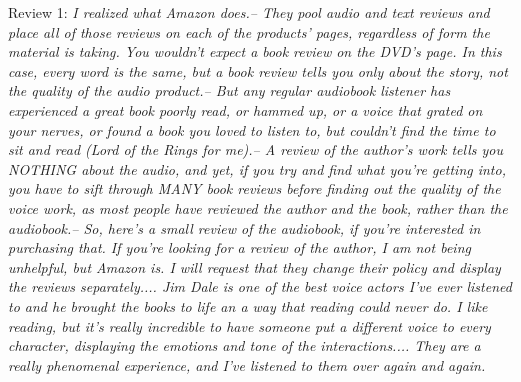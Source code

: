 \documentclass[12pt, a4paper]{article}
\begin{document}
\dotfill
\begin{itemize}
    {\fontsize{9pt}{11pt}\selectfont
    \item Review 1: \textit{I realized what Amazon does.-- They pool audio and text reviews and place all of those reviews on each of the products' pages, regardless of form the material is taking. You wouldn't expect a book review on the DVD's page. In this case, every word is the same, but a book review tells you only about the story, not the quality of the audio product.-- But any regular audiobook listener has experienced a great book poorly read, or hammed up, or a voice that grated on your nerves, or found a book you loved to listen to, but couldn't find the time to sit and read (Lord of the Rings for me).-- A review of the author's work tells you NOTHING about the audio, and yet, if you try and find what you're getting into, you have to sift through MANY book reviews before finding out the quality of the voice work, as most people have reviewed the author and the book, rather than the audiobook.-- So, here's a small review of the audiobook, if you're interested in purchasing that. If you're looking for a review of the author, I am not being unhelpful, but Amazon is. I will request that they change their policy and display the reviews separately.... Jim Dale is one of the best voice actors I've ever listened to and he brought the books to life an a way that reading could never do. I like reading, but it's really incredible to have someone put a different voice to every character, displaying the emotions and tone of the interactions.... They are a really phenomenal experience, and I've listened to them over again and again.}
}
\end{itemize}
\end{document}
